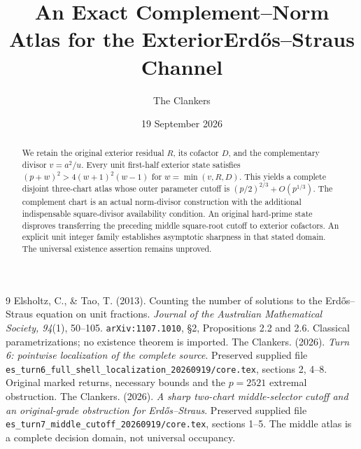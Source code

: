 \documentclass[11pt,reqno]{amsart}
\title{An Exact Complement--Norm Atlas for the Exterior\newline Erd\H{o}s--Straus Channel}
\author{The Clankers}\date{19 September 2026}
\begin{document}
\begin{abstract}
We retain the original exterior residual $R$, its cofactor $D$, and the
complementary divisor $v=a^2/u$. Every unit first-half exterior state satisfies
$(p+w)^2>4(w+1)^2(w-1)$ for $w=\min(v,R,D)$. This yields a complete disjoint
three-chart atlas whose outer parameter cutoff is
$(p/2)^{2/3}+O(p^{1/3})$. The complement chart is an actual norm-divisor
construction with the additional indispensable square-divisor availability
condition. An original hard-prime state disproves transferring the preceding
middle square-root cutoff to exterior cofactors. An explicit unit integer
family establishes asymptotic sharpness in that stated domain. The universal
existence assertion remains unproved.
\end{abstract}
\maketitle
\begin{thebibliography}{9}
 Elsholtz, C., \& Tao, T. (2013). Counting the number of solutions to the
Erd\H{o}s--Straus equation on unit fractions. \emph{Journal of the Australian
Mathematical Society, 94}(1), 50--105. \texttt{arXiv:1107.1010}, \S2,
Propositions 2.2 and 2.6. Classical parametrizations; no existence theorem is
imported.
 The Clankers. (2026). \emph{Turn 6: pointwise localization
of the complete source}. Preserved supplied file
\texttt{es\_turn6\_full\_shell\_localization\_20260919/core.tex}, sections 2,
4--8. Original marked returns, necessary bounds and the $p=2521$ extremal
obstruction.
 The Clankers. (2026). \emph{A sharp two-chart middle-selector
cutoff and an original-grade obstruction for Erd\H{o}s--Straus}. Preserved supplied
file \texttt{es\_turn7\_middle\_cutoff\_20260919/core.tex}, sections 1--5.
The middle atlas is a complete decision domain, not universal occupancy.
\end{thebibliography}
\end{document}
